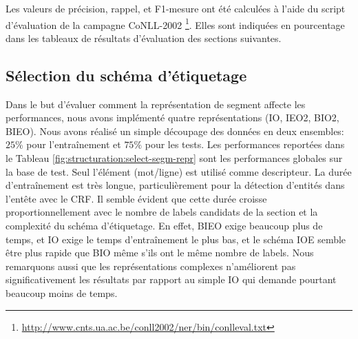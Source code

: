 Les valeurs de précision, rappel, et F1-mesure ont été calculées à l'aide du script d'évaluation de la campagne CoNLL-2002 \footnote{\url{http://www.cnts.ua.ac.be/conll2002/ner/bin/conlleval.txt}}. Elles sont indiquées en pourcentage dans les tableaux de résultats d'évaluation des sections suivantes.

\subsection{Sélection du schéma d'étiquetage}
Dans le but d'évaluer comment la représentation de segment affecte les performances, nous avons implémenté quatre représentations (IO, IEO2, BIO2, BIEO).  Nous avons réalisé un simple découpage des données en deux ensembles: $25 \%$ pour l'entraînement et $75 \%$ pour les tests. Les performances reportées dans le Tableau \ref{fig:structuration:select-segm-repr} sont les performances globales sur la base de test. Seul l'élément (mot/ligne) est utilisé comme descripteur. La durée d'entraînement est très longue, particulièrement pour la détection d'entités dans l'entête avec le CRF. Il semble évident que cette durée croisse proportionnellement avec le nombre de labels candidats de la section et la complexité du schéma d'étiquetage. En effet, BIEO exige beaucoup plus de temps, et IO exige le temps d'entraînement le plus bas, et le schéma IOE semble être plus rapide que BIO même s'ils ont le même nombre de labels. Nous remarquons aussi que les représentations complexes n'améliorent pas significativement les résultats par rapport au simple IO qui demande pourtant beaucoup moins de temps.


